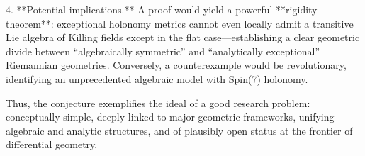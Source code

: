 4. **Potential implications.**  
   A proof would yield a powerful **rigidity theorem**: exceptional holonomy metrics cannot even locally admit a transitive Lie algebra of Killing fields except in the flat case—establishing a clear geometric divide between “algebraically symmetric” and “analytically exceptional” Riemannian geometries. Conversely, a counterexample would be revolutionary, identifying an unprecedented algebraic model with Spin(7) holonomy.

Thus, the conjecture exemplifies the ideal of a good research problem: conceptually simple, deeply linked to major geometric frameworks, unifying algebraic and analytic structures, and of plausibly open status at the frontier of differential geometry.